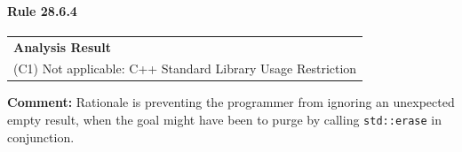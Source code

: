 \paragraph{Rule 28.6.4}
\begin{longtable}{p{13cm}}
\textbf{Analysis Result} \\
(C1) Not applicable: C++ Standard Library Usage Restriction \\
\end{longtable}
\textbf{Comment:} Rationale is preventing the programmer from ignoring an unexpected empty result, when the goal might have been to purge by calling \texttt{std::erase} in conjunction. \\
